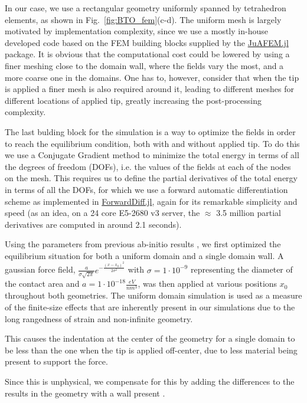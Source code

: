 In our case, we use a rectangular geometry uniformly spanned by tetrahedron elements, as shown in Fig.~\ref{fig:BTO_fem}(c-d).
The uniform mesh is largely motivated by implementation complexity, since we use a mostly in-house developed code based on the FEM building blocks supplied by the \href{https://github.com/KristofferC/JuAFEM.jl}{JuAFEM.jl} package.
It is obvious that the computational cost could be lowered by using a finer meshing close to the domain wall, where the fields vary the most, and a more coarse one in the domains.
One has to, however, consider that when the tip is applied a finer mesh is also required around it, leading to different meshes for different locations of applied tip, greatly increasing the post-processing complexity.

The last bulding block for the simulation is a way to optimize the fields in order to reach the equilibrium condition, both with and without applied tip.
To do this we use a Conjugate Gradient method to minimize the total energy in terms of all the degrees of freedom (DOFs), i.e. the values of the fields at each of the nodes on the mesh.
This requires us to define the partial derivatives of the total energy in terms of all the DOFs, for which we use a forward automatic differentiation scheme as implemented in \href{www.juliadiff.org/ForwardDiff.jl/latest/}{ForwardDiff.jl}, again for its remarkable simplicity and speed (as an idea, on a 24 core E5-2680 v3 server, the $\approx$ 3.5 million partial derivatives are computed in around 2.1 seconds).

Using the parameters from previous ab-initio results \cite{Marton2010}, we first optimized the equilibrium situation for both a uniform domain and a single domain wall.
A gaussian force field, $\frac{a}{\sigma \sqrt{2\pi}}e^{-\frac{(x-x_0)^2}{2\sigma^2}}$ with $\sigma = 1 \cdot 10^{-9}$ representing the diameter of the contact area and $a = 1 \cdot 10^{-18} \frac{eV}{nm^3}$, was then applied at various positions $x_0$ throughout both geometries.
The uniform domain simulation is used as a measure of the finite-size effects that are inherently present in our simulations due to the long rangedness of strain and non-infinite geometry.

This causes the indentation at the center of the geometry for a single domain to be less than the one when the tip is applied off-center, due to less material being present to support the force.


Since this is unphysical, we compensate for this by adding the differences to the results in the geometry with a wall present .

